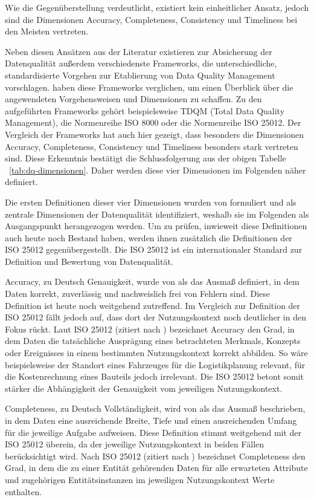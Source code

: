 \documentclass[../main.tex]{subfiles}
\begin{document}
\endgroup

Wie die Gegenüberstellung verdeutlicht, existiert kein einheitlicher Ansatz, jedoch sind die Dimensionen Accuracy, Completeness, Consistency und Timeliness bei den Meisten vertreten.

Neben diesen Ansätzen aus der Literatur existieren zur Absicherung der Datenqualität außerdem verschiedenste Frameworks, die unterschiedliche, standardisierte Vorgehen zur Etablierung von Data Quality Management vorschlagen. \textcite{zotero-item-21} haben diese Frameworks verglichen, um einen Überblick über die angewendeten Vorgehensweisen und Dimensionen zu schaffen. Zu den aufgeführten Frameworks gehört beispielsweise TDQM (Total Data Quality Management), die Normenreihe ISO 8000 oder die Normenreihe ISO 25012. Der Vergleich der Frameworks hat auch hier gezeigt, dass besonders die Dimensionen Accuracy, Completeness, Consistency und Timeliness besonders stark vertreten sind. Diese Erkenntnis bestätigt die Schlussfolgerung aus der obigen Tabelle ~\ref{tab:dq-dimensionen}. Daher werden diese vier Dimensionen im Folgenden näher definiert. 

Die ersten Definitionen dieser vier Dimensionen wurden von \textcite{wangAccuracyWhatData1996} formuliert und als zentrale Dimensionen der Datenqualität identifiziert, weshalb sie im Folgenden als Ausgangspunkt herangezogen werden. Um zu prüfen, inwieweit diese Definitionen auch heute noch Bestand haben, werden ihnen zusätzlich die Definitionen der ISO 25012 gegenübergestellt. Die ISO 25012 ist ein internationaler Standard zur Definition und Bewertung von Datenqualität.

Accuracy, zu Deutsch Genauigkeit, wurde von \textcite{wangAccuracyWhatData1996} als das Ausmaß definiert, in dem Daten korrekt, zuverlässig und nachweislich frei von Fehlern sind. Diese Definition ist heute noch weitgehend zutreffend. Im Vergleich zur Definition der ISO 25012 fällt jedoch auf, dass dort der Nutzungskontext noch deutlicher in den Fokus rückt. Laut ISO 25012 (zitiert nach \parencite{zotero-item-22}) bezeichnet Accuracy den Grad, in dem Daten die tatsächliche Ausprägung eines betrachteten Merkmals, Konzepts oder Ereignisses in einem bestimmten Nutzungskontext korrekt abbilden. So wäre beispielsweise der Standort eines Fahrzeuges für die Logistikplanung relevant, für die Kostenrechnung eines Bauteils jedoch irrelevant. Die ISO 25012 betont somit stärker die Abhängigkeit der Genauigkeit vom jeweiligen Nutzungskontext.

Completeness, zu Deutsch Vollständigkeit, wird von \textcite{wangAccuracyWhatData1996} als das Ausmaß beschrieben, in dem Daten eine ausreichende Breite, Tiefe und einen ausreichenden Umfang für die jeweilige Aufgabe aufweisen. Diese Definition stimmt weitgehend mit der ISO 25012 überein, da der jeweilige Nutzungskontext in beiden Fällen berücksichtigt wird. Nach ISO 25012 (zitiert nach \parencite{zotero-item-22}) bezeichnet Completeness den Grad, in dem die zu einer Entität gehörenden Daten für alle erwarteten Attribute und zugehörigen Entitätsinstanzen im jeweiligen Nutzungskontext Werte enthalten.
\end{document}
